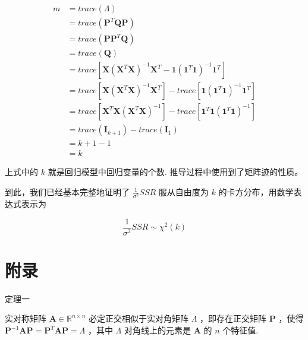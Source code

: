 \documentclass[UTF8]{ctexart}
\begin{document}
    \begin{equation}
        \begin{aligned}
            m & = trace(\boldsymbol{\varLambda}) \\
            & = trace(\boldsymbol{P}^T \boldsymbol{Q} \boldsymbol{P}) \\
            & = trace(\boldsymbol{P} \boldsymbol{P}^T \boldsymbol{Q}) \\
            & = trace(\boldsymbol{Q}) \\
            & = trace[\boldsymbol{X} (\boldsymbol{X}^T \boldsymbol{X})^{-1} \boldsymbol{X}^T - \boldsymbol{1}  (\boldsymbol{1}^T \boldsymbol{1})^{-1} \boldsymbol{1}^T] \\
            & = trace[\boldsymbol{X} (\boldsymbol{X}^T \boldsymbol{X})^{-1} \boldsymbol{X}^T] - trace[\boldsymbol{1}  (\boldsymbol{1}^T \boldsymbol{1})^{-1} \boldsymbol{1}^T] \\
            & = trace[\boldsymbol{X}^T \boldsymbol{X} (\boldsymbol{X}^T \boldsymbol{X})^{-1}] - trace[\boldsymbol{1}^T \boldsymbol{1} (\boldsymbol{1}^T \boldsymbol{1})^{-1}] \\
            & = trace(\boldsymbol{I}_{k + 1}) - trace(\boldsymbol{I}_1) \\
            & = k + 1 - 1 \\
            & = k
        \end{aligned}
    \end{equation}

    上式中的 $ k $ 就是回归模型中回归变量的个数. 推导过程中使用到了矩阵迹的性质。
    
    到此，我们已经基本完整地证明了 $ \frac{1}{\sigma^2} SSR $ 服从自由度为 $ k $ 的卡方分布，用数学表达式表示为
    
    \begin{equation}
    	\frac{1}{\sigma^2} SSR \sim \mathcal{\chi}^2(k)
    \end{equation}


    
    
    

    
    
    
    \section{附录}
    定理一
    
    实对称矩阵 $ \boldsymbol{A} \in \mathbb{R}^{n \times n} $ 必定正交相似于实对角矩阵 $ \boldsymbol{\varLambda} $ ，即存在正交矩阵 $ \boldsymbol{P} $ ，使得 $ \boldsymbol{P}^{-1} \boldsymbol{A} \boldsymbol{P} = \boldsymbol{P}^T \boldsymbol{A} \boldsymbol{P} = \boldsymbol{\varLambda} $ ，其中 $ \boldsymbol{\varLambda} $ 对角线上的元素是 $ \boldsymbol{A} $ 的 $ n $ 个特征值.
    
\end{document}
